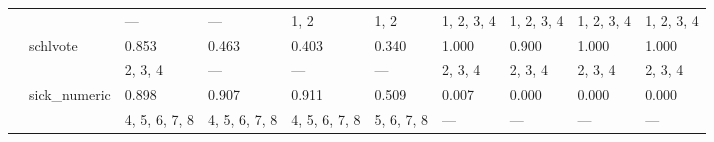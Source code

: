 \documentclass{article}
\begin{document}
\begin{center}
\begin{longtable}{p{1.2cm}p{1.8cm}p{1cm}p{1cm}p{1cm}p{1cm}p{1cm}p{1cm}p{1cm}p{1cm}}
             &              & ---              & ---              & 1, 2             & 1, 2             & 1, 2, 3, 4 & 1, 2, 3, 4    & 1, 2, 3, 4    & 1, 2, 3, 4    \\
             & schlvote     & 0.853            & 0.463            & 0.403            & 0.340            & 1.000      & 0.900         & 1.000         & 1.000         \\
             &              & 2, 3, 4          & ---              & ---              & ---              & 2, 3, 4    & 2, 3, 4       & 2, 3, 4       & 2, 3, 4       \\
             & sick\_numeric & 0.898            & 0.907            & 0.911            & 0.509            & 0.007      & 0.000         & 0.000         & 0.000         \\
             &              & 4, 5, 6, 7, 8    & 4, 5, 6, 7, 8    & 4, 5, 6, 7, 8    & 5, 6, 7, 8       & ---        & ---           & ---           & ---           \\
\hline
\end{longtable}
\end{center}
\end{document}
